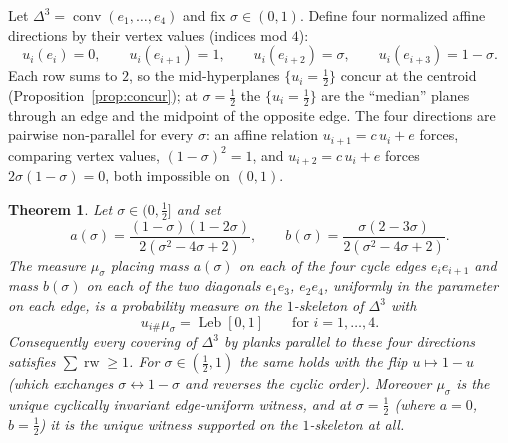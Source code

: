 \documentclass[11pt,reqno]{amsart}
\theoremstyle{plain}
\newtheorem{theorem}{Theorem}[section]
\theoremstyle{definition}
\theoremstyle{remark}
\newcommand{\rw}{\operatorname{rw}}
\newcommand{\Leb}{\operatorname{Leb}}
\begin{document}
Let $\Delta^3=\operatorname{conv}(e_1,\dots,e_4)$ and fix $\sigma\in(0,1)$.
Define four normalized affine directions by their vertex values (indices mod
$4$):
\begin{equation}\label{eq:sigma-family}
u_i(e_i)=0,\qquad u_i(e_{i+1})=1,\qquad u_i(e_{i+2})=\sigma,\qquad
u_i(e_{i+3})=1-\sigma .
\end{equation}
Each row sums to $2$, so the mid-hyperplanes $\{u_i=\tfrac12\}$ concur at the
centroid (Proposition~\ref{prop:concur}); at $\sigma=\tfrac12$ the
$\{u_i=\tfrac12\}$ are the ``median'' planes through an edge and the midpoint of
the opposite edge. The four directions are pairwise non-parallel for every
$\sigma$: an affine relation $u_{i+1}=c\,u_i+e$ forces, comparing vertex values,
$(1-\sigma)^2=1$, and $u_{i+2}=c\,u_i+e$ forces $2\sigma(1-\sigma)=0$, both
impossible on $(0,1)$.

\begin{theorem}\label{thm:simplex3}
Let $\sigma\in(0,\tfrac12]$ and set
\[
a(\sigma)=\frac{(1-\sigma)(1-2\sigma)}{2(\sigma^2-4\sigma+2)},\qquad
b(\sigma)=\frac{\sigma(2-3\sigma)}{2(\sigma^2-4\sigma+2)} .
\]
The measure $\mu_\sigma$ placing mass $a(\sigma)$ on each of the four cycle
edges $e_ie_{i+1}$ and mass $b(\sigma)$ on each of the two diagonals
$e_1e_3$, $e_2e_4$, uniformly in the parameter on each edge, is a probability
measure on the $1$-skeleton of $\Delta^3$ with
\[
u_{i\#}\mu_\sigma=\Leb[0,1]\qquad\text{for }i=1,\dots,4 .
\]
Consequently every covering of $\Delta^3$ by planks parallel to these four
directions satisfies $\sum\rw\ge1$. For $\sigma\in(\tfrac12,1)$ the same holds
with the flip $u\mapsto1-u$ (which exchanges $\sigma\leftrightarrow1-\sigma$ and
reverses the cyclic order). Moreover $\mu_\sigma$ is the unique cyclically
invariant edge-uniform witness, and at $\sigma=\tfrac12$ (where $a=0$,
$b=\tfrac12$) it is the unique witness supported on the $1$-skeleton at all.
\end{theorem}
\end{document}
